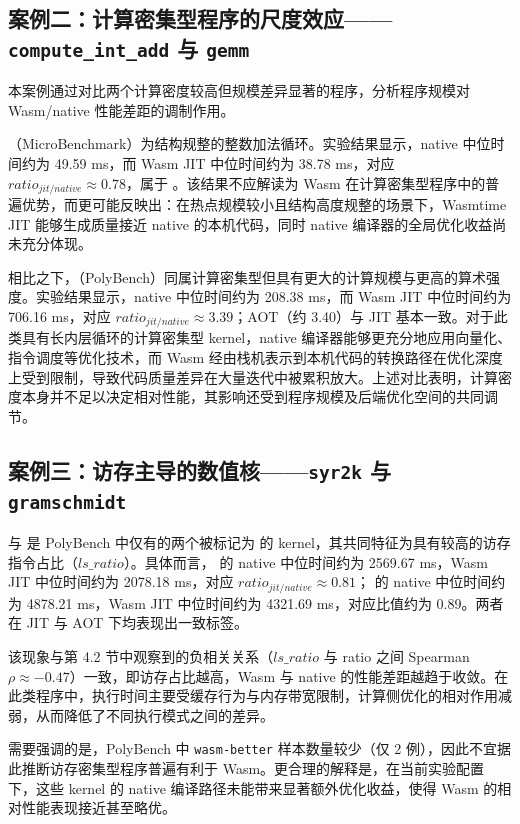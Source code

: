 \subsection{案例二：计算密集型程序的尺度效应——\texttt{compute\_int\_add} 与 \texttt{gemm}}

本案例通过对比两个计算密度较高但规模差异显著的程序，分析程序规模对 Wasm/native 性能差距的调制作用。

（MicroBenchmark）为结构规整的整数加法循环。实验结果显示，native 中位时间约为 49.59 ms，而 Wasm JIT 中位时间约为 38.78 ms，对应 $ratio_{jit/native} \approx 0.78$，属于 。该结果不应解读为 Wasm 在计算密集型程序中的普遍优势，而更可能反映出：在热点规模较小且结构高度规整的场景下，Wasmtime JIT 能够生成质量接近 native 的本机代码，同时 native 编译器的全局优化收益尚未充分体现。

相比之下，（PolyBench）同属计算密集型但具有更大的计算规模与更高的算术强度。实验结果显示，native 中位时间约为 208.38 ms，而 Wasm JIT 中位时间约为 706.16 ms，对应 $ratio_{jit/native} \approx 3.39$；AOT（约 3.40）与 JIT 基本一致。对于此类具有长内层循环的计算密集型 kernel，native 编译器能够更充分地应用向量化、指令调度等优化技术，而 Wasm 经由栈机表示到本机代码的转换路径在优化深度上受到限制，导致代码质量差异在大量迭代中被累积放大。上述对比表明，计算密度本身并不足以决定相对性能，其影响还受到程序规模及后端优化空间的共同调节。

\subsection{案例三：访存主导的数值核——\texttt{syr2k} 与 \texttt{gramschmidt}}

 与  是 PolyBench 中仅有的两个被标记为  的 kernel，其共同特征为具有较高的访存指令占比（$ls\_ratio$）。具体而言， 的 native 中位时间约为 2569.67 ms，Wasm JIT 中位时间约为 2078.18 ms，对应 $ratio_{jit/native} \approx 0.81$； 的 native 中位时间约为 4878.21 ms，Wasm JIT 中位时间约为 4321.69 ms，对应比值约为 0.89。两者在 JIT 与 AOT 下均表现出一致标签。

该现象与第 4.2 节中观察到的负相关关系（$ls\_ratio$ 与 ratio 之间 Spearman $\rho \approx -0.47$）一致，即访存占比越高，Wasm 与 native 的性能差距越趋于收敛。在此类程序中，执行时间主要受缓存行为与内存带宽限制，计算侧优化的相对作用减弱，从而降低了不同执行模式之间的差异。

需要强调的是，PolyBench 中 \texttt{wasm-better} 样本数量较少（仅 2 例），因此不宜据此推断访存密集型程序普遍有利于 Wasm。更合理的解释是，在当前实验配置下，这些 kernel 的 native 编译路径未能带来显著额外优化收益，使得 Wasm 的相对性能表现接近甚至略优。

